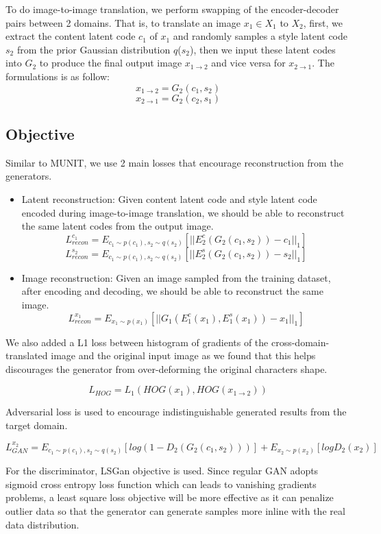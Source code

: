 \documentclass[12pt]{report}
\begin{document}
To do image-to-image translation, we perform swapping of the encoder-decoder pairs between 2 domains. That is, to translate an image $x_1$$\in$$X_1$ to $X_2$, first, we extract the content latent code $c_1$ of $x_1$ and randomly samples a style latent code $s_2$ from the prior Gaussian distribution $q$($s_2$), then we input these latent codes into $G_2$ to produce the final output image $x_{1\rightarrow2}$ and vice versa for $x_{2\rightarrow1}$. The formulations is as follow:
\[x_{1\rightarrow2} = G_2(c_1, s_2)\]
\[x_{2\rightarrow1} = G_2(c_2, s_1)\]

\subsection{Objective}
Similar to MUNIT\cite{munit}, we use 2 main losses that encourage reconstruction from the generators.
\begin{itemize}
	\item Latent reconstruction: Given content latent code and style latent code encoded during image-to-image translation, we should be able to reconstruct the same latent codes from the output image.
\[L^{c_1}_{recon} = E_{{c_1}\sim p(c_1), s_2 \sim q(s_2)}[||E^c_2(G_2(c_1,s_2)) - c_1||_1]\]
\[L^{s_2}_{recon} = E_{{c_1}\sim p(c_1), s_2 \sim q(s_2)}[||E^s_2(G_2(c_1,s_2)) - s_2||_1]\]
	\item Image reconstruction: Given an image sampled from the training dataset, after encoding and decoding, we should be able to reconstruct the same image.
\[L^{x_1}_{recon} = E_{{x_1}\sim p(x_1)}[||G_1(E^c_1(x_1), E^s_1(x_1)) - x_1||_1]\]
\end{itemize}

We also added a L1 loss between histogram of gradients\cite{hog} of the cross-domain-translated image and the original input image as we found that this helps discourages the generator from over-deforming the original characters shape.

\[L_{HOG} = L_1(HOG(x_1), HOG(x_{1\rightarrow2}))\] 

Adversarial loss is used to encourage indistinguishable generated results from the target domain.

\[L^{x_2}_{GAN} = E_{c_1\sim p(c_1), s_2\sim q(s_2)}[log(1 - D_2(G_2(c_1, s_2)))] + E_{x_2\sim p(x_2)}[log D_2(x_2)]\]

For the discriminator, LSGan objective \cite{ls-gan} is used. Since regular GAN adopts sigmoid cross entropy loss function which can leads to vanishing gradients problems, a least square loss objective will be more effective as it can penalize outlier data so that the generator can generate samples more inline with the real data distribution.
\end{document}
